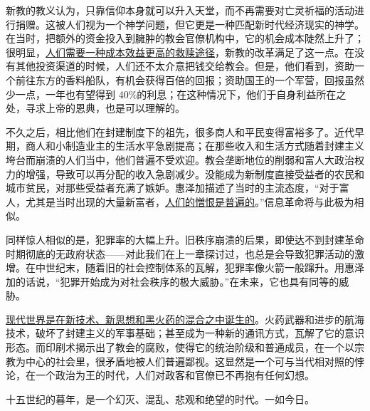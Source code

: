 新教的教义认为，只靠信仰本身就可以升入天堂，而不再需要对亡灵祈福的活动进行捐赠。这被人们视为一个神学问题，但它更是一种匹配新时代经济现实的神学。在当时，把额外的资金投入到臃肿的教会官僚机构中，它的机会成本陡然上升了；很明显，\uline{人们需要一种成本效益更高的救赎途径}，新教的改革满足了这一点。在没有其他投资渠道的时候，人们还不太介意把钱交给教会。但是，他们看到，资助一个前往东方的香料船队，有机会获得百倍的回报；资助国王的一个军营，回报虽然少一点，一年也有望得到 40\%的利息；在这种情况下，他们于自身利益所在之处，寻求上帝的恩典，也是可以理解的。

不久之后，相比他们在封建制度下的祖先，很多商人和平民变得富裕多了。近代早期，商人和小制造业主的生活水平急剧提高；在那些收入和生活方式随着封建主义垮台而崩溃的人们当中，他们普遍不受欢迎。教会垄断地位的削弱和富人大政治权力的增强，导致可以再分配的收入急剧减少。没能成为新制度直接受益者的农民和城市贫民，对那些受益者充满了嫉妒。惠泽加描述了当时的主流态度，“对于富人，尤其是当时出现的大量新富者，\uline{人们的憎恨是普遍的}。”信息革命将与此极为相似。

同样惊人相似的是，犯罪率的大幅上升。旧秩序崩溃的后果，即使达不到封建革命时期彻底的无政府状态——对此我们在上一章探讨过，也总是会导致犯罪活动的激增。在中世纪末，随着旧的社会控制体系的瓦解，犯罪率像火箭一般蹿升。用惠泽加的话说，“犯罪开始成为对社会秩序的极大威胁。”在未来，它也具有同等的威胁。

\uline{现代世界是在新技术、新思想和黑火药的混合之中诞生的}。火药武器和进步的航海技术，破坏了封建主义的军事基础；甚至成为一种新的通讯方式，瓦解了它的意识形态。而印刷术揭示出了教会的腐败，使得它的统治阶级和普通成员，在一个以宗教为中心的社会里，很矛盾地被人们普遍鄙视。这显然是一个可与当代相对照的悖论，在一个政治为王的时代，人们对政客和官僚已不再抱有任何幻想。

十五世纪的暮年，是一个幻灭、混乱、悲观和绝望的时代。一如今日。